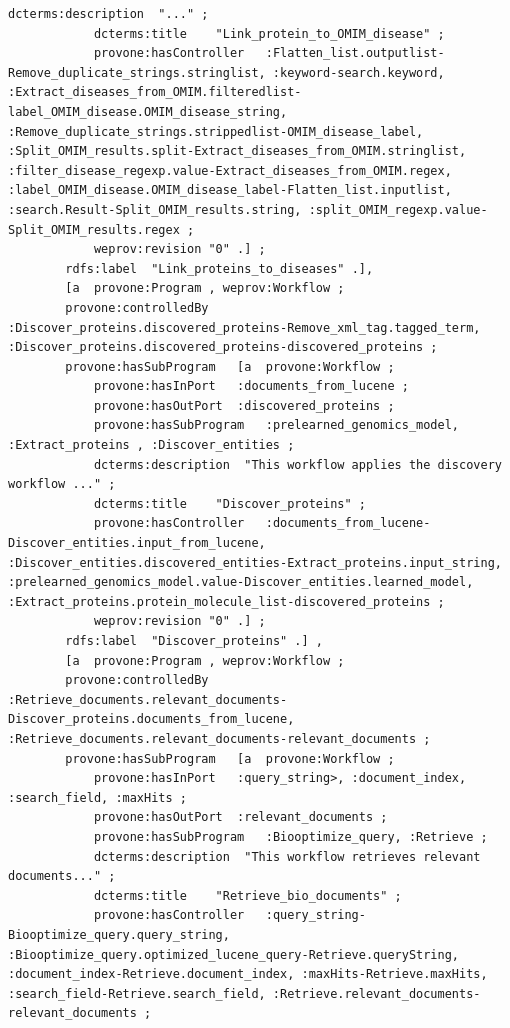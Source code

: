 \documentclass[ao]{iosart2x}
\begin{document}
\begin{lstlisting}[frame=single, caption={BioAIDDiseaseDiscovery workflow  specification provenance},label={lst:specs}]
            dcterms:description  "..." ;
            dcterms:title    "Link_protein_to_OMIM_disease" ;
            provone:hasController   :Flatten_list.outputlist-Remove_duplicate_strings.stringlist, :keyword-search.keyword, :Extract_diseases_from_OMIM.filteredlist-label_OMIM_disease.OMIM_disease_string, :Remove_duplicate_strings.strippedlist-OMIM_disease_label, :Split_OMIM_results.split-Extract_diseases_from_OMIM.stringlist, :filter_disease_regexp.value-Extract_diseases_from_OMIM.regex, :label_OMIM_disease.OMIM_disease_label-Flatten_list.inputlist, :search.Result-Split_OMIM_results.string, :split_OMIM_regexp.value-Split_OMIM_results.regex ;
            weprov:revision "0" .] ;
        rdfs:label  "Link_proteins_to_diseases" .], 
        [a  provone:Program , weprov:Workflow ;
        provone:controlledBy    :Discover_proteins.discovered_proteins-Remove_xml_tag.tagged_term, :Discover_proteins.discovered_proteins-discovered_proteins ;
        provone:hasSubProgram   [a  provone:Workflow ;
            provone:hasInPort   :documents_from_lucene ;
            provone:hasOutPort  :discovered_proteins ;
            provone:hasSubProgram   :prelearned_genomics_model, :Extract_proteins , :Discover_entities ;
            dcterms:description  "This workflow applies the discovery workflow ..." ;
            dcterms:title    "Discover_proteins" ;
            provone:hasController   :documents_from_lucene-Discover_entities.input_from_lucene, :Discover_entities.discovered_entities-Extract_proteins.input_string, :prelearned_genomics_model.value-Discover_entities.learned_model, :Extract_proteins.protein_molecule_list-discovered_proteins ;
            weprov:revision "0" .] ;
        rdfs:label  "Discover_proteins" .] , 
        [a  provone:Program , weprov:Workflow ;
        provone:controlledBy    :Retrieve_documents.relevant_documents-Discover_proteins.documents_from_lucene, :Retrieve_documents.relevant_documents-relevant_documents ;
        provone:hasSubProgram   [a  provone:Workflow ;
            provone:hasInPort   :query_string>, :document_index, :search_field, :maxHits ;
            provone:hasOutPort  :relevant_documents ;
            provone:hasSubProgram   :Biooptimize_query, :Retrieve ;
            dcterms:description  "This workflow retrieves relevant documents..." ;
            dcterms:title    "Retrieve_bio_documents" ;
            provone:hasController   :query_string-Biooptimize_query.query_string, :Biooptimize_query.optimized_lucene_query-Retrieve.queryString, :document_index-Retrieve.document_index, :maxHits-Retrieve.maxHits, :search_field-Retrieve.search_field, :Retrieve.relevant_documents-relevant_documents ;

\end{lstlisting}
\end{document}
